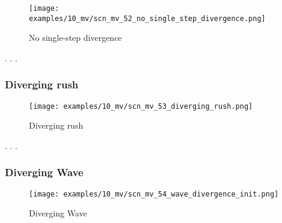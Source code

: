 \vspace*{-1.4\baselineskip}
\noindent
\begin{figure}[!h]
\texttt{[image: examples/10\_mv/scn\_mv\_52\_no\_single\_step\_divergence.png]}
\vspace*{-1.3\baselineskip}
\caption{No single-step divergence}
\label{fig:scn_mv_52_no_single_step_divergence}
\end{figure}

\vspace*{-0.4\baselineskip}
. . .

\clearpage %

\subsubsection*{Diverging rush}
\label{sec:Miranda's veil/Wave/Divergence/Diverging rush}

\vspace*{-1.4\baselineskip}
\noindent
\begin{figure}[!h]
\texttt{[image: examples/10\_mv/scn\_mv\_53\_diverging\_rush.png]}
\vspace*{-1.3\baselineskip}
\caption{Diverging rush}
\label{fig:scn_mv_53_diverging_rush}
\end{figure}

\vspace*{-0.4\baselineskip}
. . .

\clearpage %

\subsubsection*{Diverging Wave}
\label{sec:Miranda's veil/Wave/Divergence/Diverging Wave}

\vspace*{-1.4\baselineskip}
\noindent
\begin{figure}[!h]
\texttt{[image: examples/10\_mv/scn\_mv\_54\_wave\_divergence\_init.png]}
\vspace*{-1.3\baselineskip}
\caption{Diverging Wave}
\label{fig:scn_mv_54_wave_divergence_init}
\end{figure}

